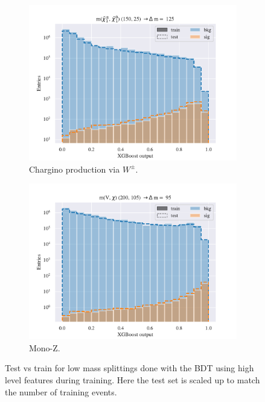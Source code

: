 \begin{figure}[H]
    \begin{subfigure}[t!]{0.49\textwidth}
        \includegraphics[width = \textwidth]{Figures/WW/BDT/High_level/Low/scaled_train_test_395268.pdf}
        \caption{Chargino production via $W^\pm$.}
        \label{fig:}
    \end{subfigure}
    \begin{subfigure}[t!]{0.49\textwidth}
        \includegraphics[width = \textwidth]{Figures/Mono_Z/ML/BDT/High_level/Low/scaled_train_test_310604.pdf}
        \caption{Mono-Z.}
        \label{fig:}
    \end{subfigure}
    \caption{Test vs train for low mass splittings done with the BDT using high level features during training. Here the test set is scaled up to match the number of training events.}
    \label{fig:Non}
\end{figure}


